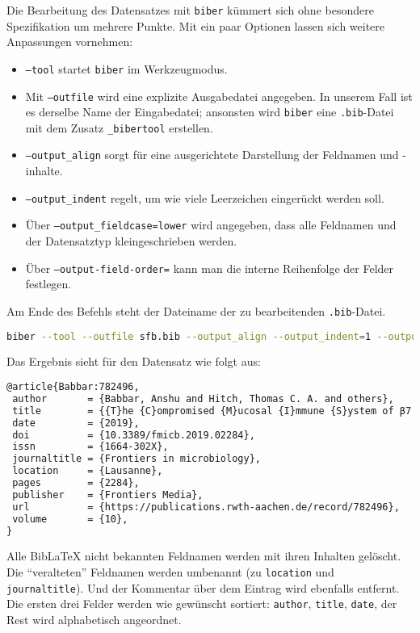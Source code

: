 \documentclass[ngerman]{dtk}
\begin{document}
Die Bearbeitung des Datensatzes mit \texttt{biber} kümmert sich ohne besondere Spezifikation
um mehrere Punkte.
Mit ein paar Optionen lassen sich weitere Anpassungen vornehmen: 
\begin{itemize}
  \item \texttt{--tool} startet \texttt{biber} im Werkzeugmodus.
  \item Mit \texttt{--outfile}  wird eine explizite
Ausgabedatei angegeben. In unserem Fall ist es derselbe Name der Eingabedatei;
ansonsten wird \texttt{biber} eine \texttt{.bib}-Datei mit dem Zusatz \texttt{\_bibertool} erstellen.
  \item \texttt{--output\_align} sorgt für eine ausgerichtete Darstellung der Feldnamen und -inhalte.
  \item \texttt{--output\_indent} regelt, um wie viele Leerzeichen eingerückt werden soll.
  \item Über \texttt{--output\_fieldcase=lower} wird angegeben, dass alle Feldnamen und der Datensatztyp kleingeschrieben werden.
  \item Über \texttt{--output-field-order=} kann man die interne Reihenfolge der Felder festlegen.
\end{itemize}
Am Ende des Befehls steht der Dateiname der zu bearbeitenden \texttt{.bib}-Datei.

\begin{lstlisting}[style=nonumber,language=Bash]
biber --tool --outfile sfb.bib --output_align --output_indent=1 --output_fieldcase=lower --output-field-order=author,title,date sfb.bib
\end{lstlisting}
Das Ergebnis sieht für den Datensatz wie folgt aus:
\begin{lstlisting}[style=number,language=TeX]
@article{Babbar:782496,
 author       = {Babbar, Anshu and Hitch, Thomas C. A. and others},
 title        = {{T}he {C}ompromised {M}ucosal {I}mmune {S}ystem of β7 {I}ntegrin-{D}eficient {M}ice {H}as {O}nly {M}inor {E}ffects on the {F}ecal {M}icrobiota in {H}omeostasis},
 date         = {2019},
 doi          = {10.3389/fmicb.2019.02284},
 issn         = {1664-302X},
 journaltitle = {Frontiers in microbiology},
 location     = {Lausanne},
 pages        = {2284},
 publisher    = {Frontiers Media},
 url          = {https://publications.rwth-aachen.de/record/782496},
 volume       = {10},
}
\end{lstlisting}
Alle BibLaTeX nicht bekannten Feldnamen werden mit ihren Inhalten gelöscht.
Die ``veralteten'' Feldnamen werden umbenannt (zu \texttt{location} und \texttt{journaltitle}).
Und der Kommentar über dem Eintrag wird ebenfalls entfernt.
Die ersten drei Felder werden wie gewünscht sortiert: \texttt{author}, \texttt{title}, \texttt{date}, der Rest
wird alphabetisch angeordnet.
\end{document}

